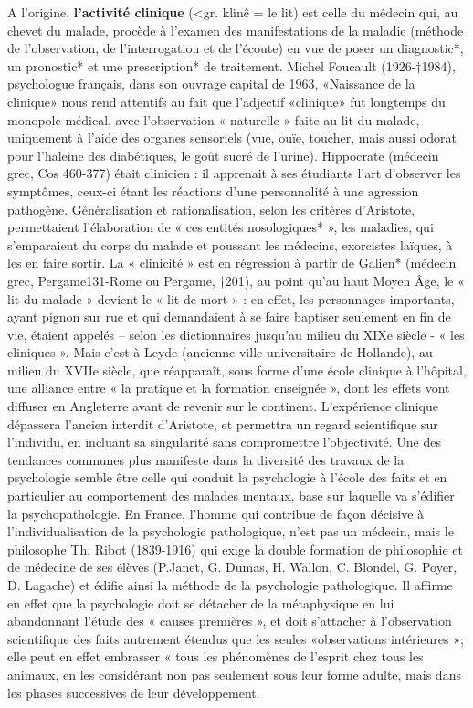 A l’origine,\textbf{ l’activité clinique} (<gr. klinê = le lit) est celle du médecin qui, au chevet du malade, procède à l’examen des manifestations de la maladie (méthode de l’observation, de l’interrogation et de l’écoute) en vue de poser un diagnostic*, un pronostic* et une prescription* de traitement.
Michel Foucault (1926-†1984), psychologue français, dans son ouvrage capital de 1963,
«Naissance de la clinique» nous rend attentifs au fait que l’adjectif «clinique» fut longtemps du monopole médical, avec l’observation « naturelle » faite au lit du malade, uniquement à l’aide des organes sensoriels (vue, ouïe, toucher, mais aussi odorat pour l’haleine des diabétiques, le goût sucré de l’urine).
Hippocrate (médecin grec, Cos 460-377) était clinicien : il apprenait à ses étudiants l’art d’observer les symptômes, ceux-ci étant les réactions d’une personnalité à une agression pathogène. Généralisation et rationalisation, selon les critères d’Aristote, permettaient l’élaboration de « ces entités nosologiques* », les maladies, qui s’emparaient du corps du malade et poussant les médecins, exorcistes laïques, à les en faire sortir.
La « clinicité » est en régression à partir de Galien* (médecin grec, Pergame131-Rome ou Pergame, †201), au point qu’au haut Moyen Âge, le « lit du malade » devient le « lit de mort » : en effet, les personnages importants, ayant pignon sur rue et qui demandaient à se
faire baptiser seulement en fin de vie, étaient appelés – selon les dictionnaires jusqu’au milieu du XIXe siècle - « les cliniques ».
Mais c’est à Leyde (ancienne ville universitaire de Hollande), au milieu du XVIIe siècle, que réapparaît, sous forme d’une école clinique à l’hôpital, une alliance entre « la pratique et la formation enseignée », dont les effets vont diffuser en Angleterre avant de revenir sur le continent. L’expérience clinique dépassera l’ancien interdit d’Aristote, et permettra un regard scientifique sur l’individu, en incluant sa singularité sans compromettre l’objectivité.
Une des tendances communes plus manifeste dans la diversité des travaux de la psychologie semble être celle qui conduit la psychologie à l’école des faits et en particulier au comportement des malades mentaux, base sur laquelle va s’édifier la psychopathologie.
En France, l’homme qui contribue de façon décisive à l’individualisation de la psychologie pathologique, n’est pas un médecin, mais le philosophe Th. Ribot (1839-1916) qui exige la double formation de philosophie et de médecine de ses élèves (P.Janet, G. Dumas, H. Wallon, C. Blondel, G. Poyer, D. Lagache) et édifie ainsi la méthode de la psychologie pathologique. Il affirme en effet que la psychologie doit se détacher de la métaphysique en lui abandonnant l’étude des « causes premières », et doit s’attacher à l’observation scientifique des faits autrement étendus que les seules «observations intérieures »; elle peut en effet embrasser « tous les phénomènes de l’esprit chez tous les animaux, en les considérant non pas seulement sous leur forme adulte, mais dans les phases successives de leur développement.

